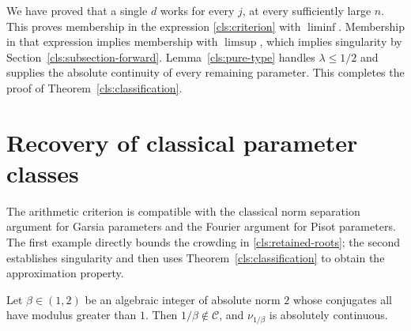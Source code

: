 We have proved that a single $d$ works for every $j$, at every
sufficiently large $n$.  This proves membership in the expression
\eqref{cls:criterion} with $\liminf$.  Membership in that expression
implies membership with $\limsup$, which implies singularity by
Section~\ref{cls:subsection-forward}.  Lemma~\ref{cls:pure-type}
handles $\lambda\leq1/2$ and supplies the absolute continuity of every
remaining parameter.  This completes the proof of
Theorem~\ref{cls:classification}.

\section{Recovery of classical parameter classes}
\label{cls:section-classical}

The arithmetic criterion is compatible with the classical norm
separation argument for Garsia parameters and the Fourier argument for
Pisot parameters.  The first example directly bounds the crowding in
\eqref{cls:retained-roots}; the second establishes singularity and then
uses Theorem~\ref{cls:classification} to obtain the approximation
property.

\begin{proposition}
\label{cls:garsia}
Let $\beta\in(1,2)$ be an algebraic integer of absolute norm $2$ whose
conjugates all have modulus greater than $1$.  Then $1/\beta\notin
\mathcal C$, and $\nu_{1/\beta}$ is absolutely continuous.
\end{proposition}


